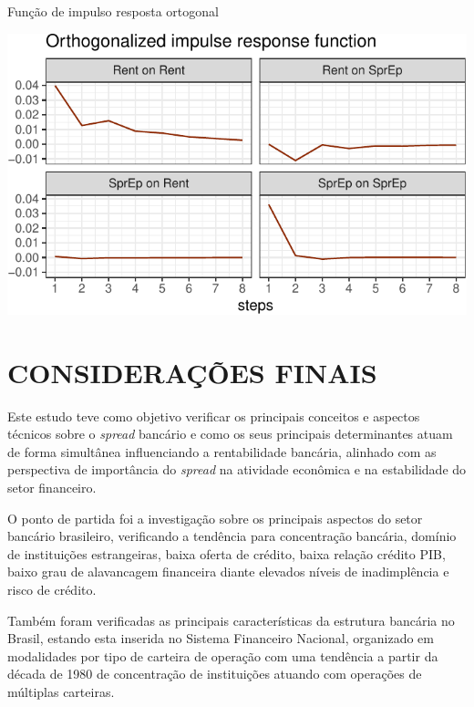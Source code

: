 \documentclass[
  12pt,
  12pt,
  openright,
  oneside,
  a4paper,
  chapter=TITLE,
  section=TITLE,
  subsection=TITLE,
  subsubsection=TITLE,
  english,
  portugues,
  sumario=tradicional]{abntex2}
\begin{document}
\begin{grafico}[!htbp]
\caption{Função de impulso resposta ortogonal}
\vspace{-4mm}

\begin{center}\includegraphics{12-exportedfigures/impulse.plot.orto-1} \end{center}
\vspace{-3mm}
\label{graf:impulseorto}
\vspace{-2mm}
\end{grafico}


\chapter*[Conclusão]{CONSIDERAÇÕES FINAIS}

Este estudo teve como objetivo verificar os principais conceitos e aspectos técnicos sobre o \emph{spread} bancário e como os seus principais determinantes atuam de forma simultânea influenciando a rentabilidade bancária, alinhado com as perspectiva de importância do \emph{spread} na atividade econômica e na estabilidade do setor financeiro.

O ponto de partida foi a investigação sobre os principais aspectos do setor bancário brasileiro, verificando a tendência para concentração bancária, domínio de instituições estrangeiras, baixa oferta de crédito, baixa relação crédito PIB, baixo grau de alavancagem financeira diante elevados níveis de inadimplência e risco de crédito.

Também foram verificadas as principais características da estrutura bancária no Brasil, estando esta inserida no Sistema Financeiro Nacional, organizado em modalidades por tipo de carteira de operação com uma tendência a partir da década de 1980 de concentração de instituições atuando com operações de múltiplas carteiras.
\end{document}
